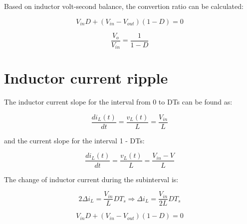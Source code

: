 Based on inductor volt-second balance, the convertion ratio can be calculated:

\begin{equation}
	V_{in}D + (V_{in}-V_{out})(1-D) = 0
	\label{eq:pumpHeadModel}
\end{equation}

\begin{equation}
	\frac{V_o}{V_{in}} = \frac{1}{1-D}
	\label{eq:pumpHeadMode5}
\end{equation}

\section{Inductor current ripple}\label{sec:SON}

The inductor current slope for the interval from 0 to DTs can be found as:

\begin{equation}
	\frac{di_{L}(t)}{dt} = \frac{v_{L}(t)}{L} = \frac{V_{in}}{L}
	\label{eq:pumpHeadMode5}
\end{equation}

and the current slope for the interval 1 - DTs:

\begin{equation}
	\frac{di_{L}(t)}{dt} = \frac{v_{L}(t)}{L} = \frac{V_{in} - V}{L}
	\label{eq:pumpHeadMode5}
\end{equation}

The change of inductor current during the subinterval is:

\begin{equation}
	2\Delta i_L = \frac{V_{in}}{L}DT_s \Rightarrow
  \Delta i_L = \frac{V_{in}}{2L}DT_s
	\label{eq:pumpHeadMode5}
\end{equation}

\begin{equation}
	V_{in}D + (V_{in}-V_{out})(1-D) = 0
	\label{eq:pumpHeadModel}
\end{equation}

